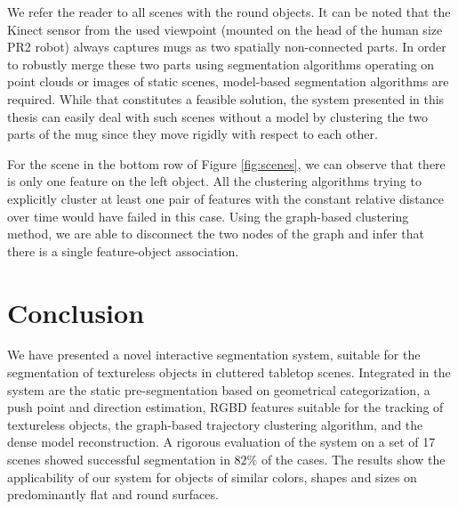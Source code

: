 We refer the  reader to all scenes with
the round objects. 
It can be noted that
the Kinect sensor from the used viewpoint (mounted on the head of the human size PR2 robot) always
captures mugs as two spatially non-connected parts.
In order to robustly merge these two parts using segmentation
algorithms operating on point clouds or images of static scenes, 
model-based segmentation algorithms are required. While that constitutes a feasible solution,
the system presented in this
thesis can easily deal with such scenes without a model by clustering the two
parts of the mug since they move rigidly with respect to each other.

 For  the scene in the bottom row  of Figure \ref{fig:scenes},  we can  observe that
 there is only one feature on the left object.  All   the  clustering  algorithms  trying  to
 explicitly cluster  at least one  pair of features with  the constant
 relative  distance over  time would have failed  in this  case.  Using  the
 graph-based clustering method, we are able to disconnect the two nodes
 of  the  graph  and infer  that  there  is a single feature-object association.



\section{Conclusion}
\label{sec:conclusion}
We have  presented a novel interactive segmentation  system, suitable for
the segmentation of textureless  objects in cluttered tabletop scenes.
Integrated  in the  system are  the static  pre-segmentation  based on
geometrical   categorization,  a  push   point and direction estimation, 
RGBD features  suitable for the tracking of
textureless objects,  the graph-based trajectory  clustering algorithm,
and the  dense model reconstruction.  A rigorous  evaluation of the
system on a  set of 17 scenes showed successful segmentation in $82\%$ of the cases.  
The results show the applicability of our system
for objects of similar colors,  shapes and sizes on predominantly flat
and  round surfaces.  